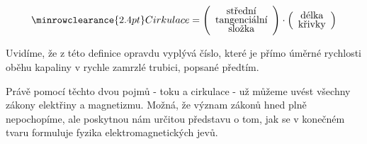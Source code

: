     
    \begin{equation}\label{fyz:eq_fey_elmag05}
      \renewcommand\arraystretch{0.6} \setlength\minrowclearance{2.4pt}
      \text{Cirkulace} = 
        \left(\begin{array}{c}
          \text{střední}      \\
          \text{tangenciální} \\
          \text{složka}
         \end{array}
       \right)\cdot
       \left(\begin{array}{c}
          \text{délka}      \\
          \text{křivky}
        \end{array}
       \right)
    \end{equation}

    Uvidíme, že z této definice opravdu vyplývá číslo, které je přímo úměrné rychlosti oběhu 
    kapaliny v rychle zamrzlé trubici, popsané předtím.
    
    Právě pomocí těchto dvou pojmů - toku a cirkulace - už můžeme uvést všechny zákony elektřiny a
    magnetizmu. Možná, že význam zákonů hned plně nepochopíme, ale poskytnou nám určitou představu 
    o tom, jak se v konečném tvaru formuluje fyzika elektromagnetických jevů.

  

